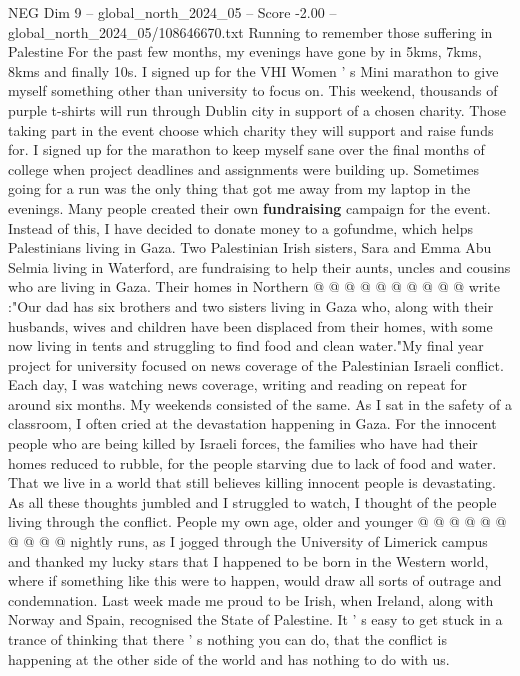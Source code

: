 \begin{textsample}{NEG Dim 9 – global\_north\_2024\_05 – Score -2.00 – global\_north\_2024\_05/108646670.txt}  \label{ex:f9_neg_163}
Running to remember those suffering in Palestine For the past few months, my evenings have gone by in 5kms, 7kms, 8kms and finally 10s.
I signed up for the VHI Women ' s Mini marathon to give myself something other than university to focus on.
This weekend, thousands of purple t-shirts will run through Dublin city in support of a chosen charity.
Those taking part in the event choose which charity they will support and raise funds for.
I signed up for the marathon to keep myself sane over the final months of college when project deadlines and assignments were building up.
Sometimes going for a run was the only thing that got me away from my laptop in the evenings.
Many people created their own \textbf{fundraising} campaign for the event.
Instead of this, I have decided to donate money to a gofundme, which helps Palestinians living in Gaza.
Two Palestinian Irish sisters, Sara and Emma Abu Selmia living in Waterford, are fundraising to help their aunts, uncles and cousins who are living in Gaza.
Their homes in Northern @ @ @ @ @ @ @ @ @ @ write :"Our dad has six brothers and two sisters living in Gaza who, along with their husbands, wives and children have been displaced from their homes, with some now living in tents and struggling to find food and clean water."My final year project for university focused on news coverage of the Palestinian Israeli conflict.
Each day, I was watching news coverage, writing and reading on repeat for around six months.
My weekends consisted of the same.
As I sat in the safety of a classroom, I often cried at the devastation happening in Gaza.
For the innocent people who are being killed by Israeli forces, the families who have had their homes reduced to rubble, for the people starving due to lack of food and water.
That we live in a world that still believes killing innocent people is devastating.
As all these thoughts jumbled and I struggled to watch, I thought of the people living through the conflict.
People my own age, older and younger @ @ @ @ @ @ @ @ @ @ nightly runs, as I jogged through the University of Limerick campus and thanked my lucky stars that I happened to be born in the Western world, where if something like this were to happen, would draw all sorts of outrage and condemnation.
Last week made me proud to be Irish, when Ireland, along with Norway and Spain, recognised the State of Palestine.
It ' s easy to get stuck in a trance of thinking that there ' s nothing you can do, that the conflict is happening at the other side of the world and has nothing to do with us.

\end{textsample}
